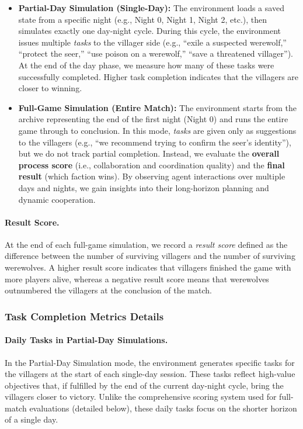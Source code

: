 \begin{itemize}
    \item \textbf{Partial-Day Simulation (Single-Day):}
    The environment loads a saved state from a specific night (e.g., Night 0, Night 1, Night 2, etc.), then simulates exactly one day-night cycle. During this cycle, the environment issues multiple \emph{tasks} to the villager side (e.g., “exile a suspected werewolf,” “protect the seer,” “use poison on a werewolf,” “save a threatened villager”). At the end of the day phase, we measure how many of these tasks were successfully completed. Higher task completion indicates that the villagers are closer to winning.

    \item \textbf{Full-Game Simulation (Entire Match):}
    The environment starts from the archive representing the end of the first night (Night 0) and runs the entire game through to conclusion. In this mode, \emph{tasks} are given only as suggestions to the villagers (e.g., “we recommend trying to confirm the seer’s identity”), but we do not track partial completion. Instead, we evaluate the \textbf{overall process score} (i.e., collaboration and coordination quality) and the \textbf{final result} (which faction wins). By observing agent interactions over multiple days and nights, we gain insights into their long-horizon planning and dynamic cooperation.
\end{itemize}
\paragraph{Result Score.} 
At the end of each full-game simulation, we record a \emph{result score} defined as 
the difference between the number of surviving villagers and the number of surviving werewolves. 
A higher result score indicates that villagers finished the game with more players alive, 
whereas a negative result score means that werewolves outnumbered the villagers at 
the conclusion of the match.
\subsubsection{Task Completion Metrics Details}

\paragraph{Daily Tasks in Partial-Day Simulations.}
In the Partial-Day Simulation mode, the environment generates specific tasks for the villagers at the start of each single-day session. These tasks reflect high-value objectives that, if fulfilled by the end of the current day-night cycle, bring the villagers closer to victory. Unlike the comprehensive scoring system used for full-match evaluations (detailed below), these daily tasks focus on the shorter horizon of a single day.

